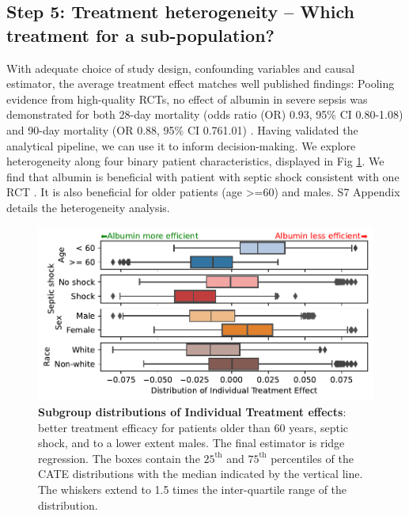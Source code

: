 \documentclass[10pt,letterpaper]{article}
\begin{document}
\subsection*{Step 5: Treatment heterogeneity -- Which treatment for a sub-population?}%
\label{sec:treamtent_heterogeneity_mimic_iv}


With adequate choice of study design, confounding variables and causal
estimator, the average treatment effect matches well published findings:
Pooling evidence from high-quality RCTs, no effect of albumin in severe
sepsis was demonstrated for both 28-day mortality (odds ratio (OR) 0.93,
95\% CI 0.80-1.08) and 90-day mortality (OR 0.88, 95\% CI 0.761.01)
\cite{xu2014comparison}.
%
Having validated the analytical pipeline, we can use it to inform
decision-making. We explore
heterogeneity along four binary patient characteristics, displayed in Fig
\ref{fig:albumin_for_sepsis:cate_results}. We find that albumin is beneficial
with patient with septic shock consistent with one
RCT  \cite{caironi2014albumin}. It is also beneficial for older patients (age >=60) and males. S7 Appendix details the heterogeneity analysis.

\begin{figure}[h!]
  \begin{minipage}{.4\linewidth}
    \caption{\textbf{Subgroup distributions of Individual Treatment
        effects}:
      better treatment efficacy for patients older than 60 years, septic shock,
      and to a lower extent males. The final estimator is ridge regression. The
      boxes contain the $25^\text{th}$ and $75^\text{th}$ percentiles of the CATE
      distributions with the median indicated by the vertical line. The whiskers
      extend to 1.5 times the inter-quartile range of the
      distribution.}\label{fig:albumin_for_sepsis:cate_results}
  \end{minipage}%
  \hfill%
  \begin{minipage}{.6\linewidth}
    \includegraphics[width=\linewidth]{img_final/Fig4.pdf}
  \end{minipage}%
\end{figure}
\end{document}
